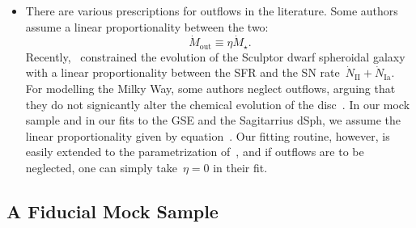 \documentclass[ms.tex]{subfiles}
\begin{document}
\begin{itemize}
	\begin{itemize}
		\item There are various prescriptions for outflows in the literature.
		Some authors~\citep[e.g.][]{Andrews2017, Weinberg2017} assume a linear
		proportionality between the two:
		\begin{equation}
		\label{eq:eta}
		\dot{M}_\text{out} \equiv \eta\dot{M}_\star.
		\end{equation}
		Recently,~\citet{delosReyes2022} constrained the evolution of the
		Sculptor dwarf spheroidal galaxy with a linear proportionality between
		the SFR and the SN rate~$\dot{N}_\text{II} + \dot{N}_\text{Ia}$.
		For modelling the Milky Way, some authors neglect outflows, arguing
		that they do not signicantly alter the chemical evolution of the
		disc~\citep[e.g.][]{Spitoni2019, Spitoni2021}.
		In our mock sample and in our fits to the GSE and the Sagitarrius dSph,
		we assume the linear proportionality given by equation~.
		Our fitting routine, however, is easily extended to the parametrization
		of~\citet{delosReyes2022}, and if outflows are to be neglected, one can
		simply take~$\eta = 0$ in their fit.
	\end{itemize}


\end{itemize}

\subsection{A Fiducial Mock Sample}
\label{sec:methods:fiducialmock}
\end{document}
